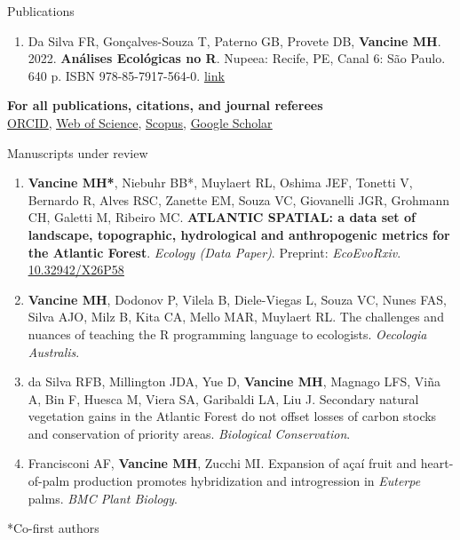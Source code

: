 \documentclass{resume}
\begin{document}
\begin{rSection}{Publications}
\begin{enumerate} 
\item Da Silva FR, Gonçalves-Souza T, Paterno GB, Provete DB, {\bf Vancine MH}. 2022. {\bf Análises Ecológicas no R}. Nupeea: Recife, PE, Canal 6: São Paulo. 640 p. ISBN 978-85-7917-564-0. \href{https://analises-ecologicas.com/}{\underline{link}}
\end{enumerate} 

{\bf For all publications, citations, and journal referees}
\\\href{https://orcid.org/0000-0001-9650-7575}{\underline{ORCID}}, \href{https://www.webofscience.com/wos/author/record/837504}{\underline{Web of Science}}, \href{https://www.scopus.com/authid/detail.uri?authorId=57193451888}{\underline{Scopus}}, \href{https://scholar.google.com/citations?user=i-2xZBQAAAAJ}{\underline{Google Scholar}}

\end{rSection}


\begin{rSection}{Manuscripts under review}

\begin{enumerate} 

\item {\bf Vancine MH*}, Niebuhr BB*, Muylaert RL, Oshima JEF, Tonetti V, Bernardo R, Alves RSC, Zanette EM, Souza VC, Giovanelli JGR, Grohmann CH, Galetti M, Ribeiro MC. {\bf ATLANTIC SPATIAL: a data set of landscape, topographic, hydrological and anthropogenic metrics for the Atlantic Forest}. {\it Ecology (Data Paper)}. Preprint: {\it EcoEvoRxiv}. \href{https://doi.org/10.32942/X26P58}{\underline{10.32942/X26P58}}

\item {\bf Vancine MH}, Dodonov P, Vilela B, Diele-Viegas L, Souza VC, Nunes FAS, Silva AJO, Milz B, Kita CA, Mello MAR, Muylaert RL. The challenges and nuances of teaching the R programming language to ecologists. {\it Oecologia Australis}.

\item da Silva RFB, Millington JDA, Yue D, {\bf Vancine MH}, Magnago LFS, Viña A, Bin F, Huesca M, Viera SA, Garibaldi LA, Liu J. Secondary natural vegetation gains in the Atlantic Forest do not offset losses of carbon stocks and conservation of priority areas. {\it Biological Conservation}.

\item Francisconi AF, {\bf Vancine MH}, Zucchi MI. Expansion of açaí fruit and heart-of-palm production promotes hybridization and introgression in {\it Euterpe} palms. {\it BMC Plant Biology}.

\end{enumerate} 

*Co-first authors

\end{rSection}
\end{document}

